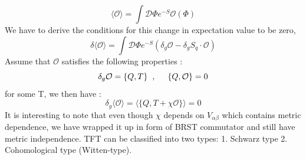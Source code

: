 \begin{equation}
 \langle \mathcal{O} \rangle = \int \mathcal{D} \Phi e^{-S} \mathcal{O}(\Phi)
 \end{equation}
We have to derive the conditions for this change in expectation value to be zero, 
\begin{equation}
\delta \langle \mathcal{O} \rangle = \int \mathcal{D} \Phi e^{-S} (\delta_{g} \mathcal{O} - \delta_{g} S_{q} \cdot \mathcal{O})
\end{equation}
Assume that $\mathcal{O}$ satisfies the following properties :
\begin{equation}
\delta_{g} \mathcal{O} = \{Q, T\}  \hspace{2mm} , \hspace{5mm} \{Q, \mathcal{O}\} = 0
\end{equation}
for some T, we then have :
\begin{equation}
\delta_{g}\langle \mathcal{O} \rangle = \langle \{Q, T + \chi \mathcal{O}\}\rangle = 0
\end{equation}
It is interesting to note that even though $\chi$ depends on $V_{\alpha\beta}$ which contains metric dependence, 
we have wrapped it up in form of BRST commutator and still have metric independence. TFT can be classified into
two types: 1. Schwarz type 2. Cohomological type (Witten-type). 
